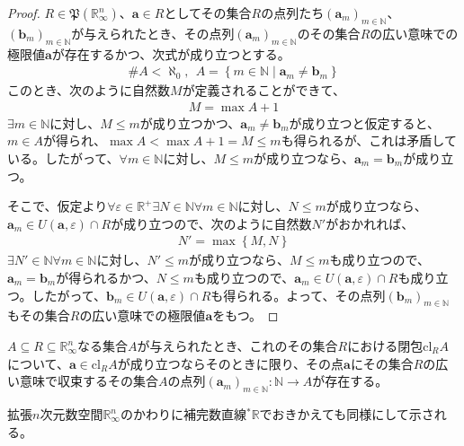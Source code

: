 \documentclass[dvipdfmx]{jsarticle}
\begin{document}
\begin{proof}
$R \in \mathfrak{P}\left( \mathbb{R}_{\infty}^{n} \right)$、$\mathbf{a} \in R$としてその集合$R$の点列たち$\left( \mathbf{a}_{m} \right)_{m \in \mathbb{N}}$、$\left( \mathbf{b}_{m} \right)_{m \in \mathbb{N}}$が与えられたとき、その点列$\left( \mathbf{a}_{m} \right)_{m \in \mathbb{N}}$のその集合$R$の広い意味での極限値$\mathbf{a}$が存在するかつ、次式が成り立つとする。
\begin{align*}
\#A < \aleph_{0},\ \ A = \left\{ m \in \mathbb{N} \middle| \mathbf{a}_{m} \neq \mathbf{b}_{m} \right\}
\end{align*}
このとき、次のように自然数$M$が定義されることができて、
\begin{align*}
M = \max A + 1
\end{align*}
$\exists m \in \mathbb{N}$に対し、$M \leq m$が成り立つかつ、$\mathbf{a}_{m} \neq \mathbf{b}_{m}$が成り立つと仮定すると、$m \in A$が得られ、$\max A < \max A + 1 = M \leq m$も得られるが、これは矛盾している。したがって、$\forall m \in \mathbb{N}$に対し、$M \leq m$が成り立つなら、$\mathbf{a}_{m} = \mathbf{b}_{m}$が成り立つ。\par
そこで、仮定より$\forall\varepsilon \in \mathbb{R}^{+}\exists N \in \mathbb{N}\forall m \in \mathbb{N}$に対し、$N \leq m$が成り立つなら、$\mathbf{a}_{m} \in U\left( \mathbf{a},\varepsilon \right) \cap R$が成り立つので、次のように自然数$N'$がおかれれば、
\begin{align*}
N' = \max\left\{ M,N \right\}
\end{align*}
$\exists N' \in \mathbb{N}\forall m \in \mathbb{N}$に対し、$N' \leq m$が成り立つなら、$M \leq m$も成り立つので、$\mathbf{a}_{m} = \mathbf{b}_{m}$が得られるかつ、$N \leq m$も成り立つので、$\mathbf{a}_{m} \in U\left( \mathbf{a},\varepsilon \right) \cap R$も成り立つ。したがって、$\mathbf{b}_{m} \in U\left( \mathbf{a},\varepsilon \right) \cap R$も得られる。よって、その点列$\left( \mathbf{b}_{m} \right)_{m \in \mathbb{N}}$もその集合$R$の広い意味での極限値$\mathbf{a}$をもつ。
\end{proof}
\begin{thm}\label{4.1.4.4}
$A \subseteq R \subseteq \mathbb{R}_{\infty}^{n}$なる集合$A$が与えられたとき、これのその集合$R$における閉包$\mathrm{cl}_{R}A$について、$\mathbf{a} \in \mathrm{cl}_{R}A$が成り立つならそのときに限り、その点$\mathbf{a}$にその集合$R$の広い意味で収束するその集合$A$の点列$\left( \mathbf{a}_{m} \right)_{m \in \mathbb{N}}:\mathbb{N} \rightarrow A$が存在する。\par
拡張$n$次元数空間$\mathbb{R}_{\infty}^{n}$のかわりに補完数直線${}^{*}\mathbb{R}$でおきかえても同様にして示される。
\end{thm}
\end{document}
